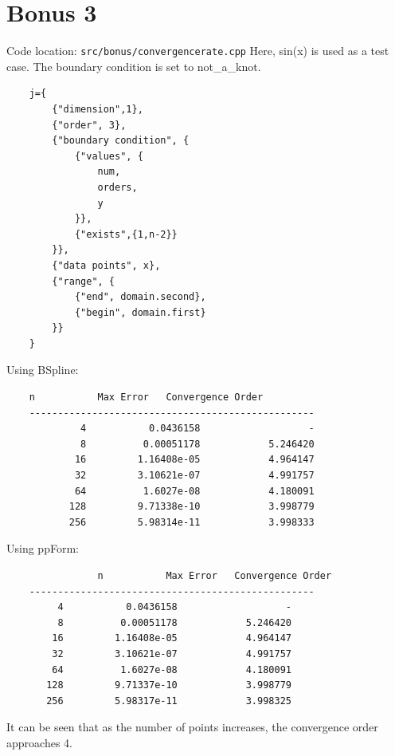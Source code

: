 \documentclass[a4paper]{article}
\begin{document}
\section*{Bonus 3}
Code location: \texttt{src/bonus/convergencerate.cpp}
Here, sin(x) is used as a test case.
The boundary condition is set to not\_a\_knot.
\begin{verbatim}
    j={
        {"dimension",1},
        {"order", 3},
        {"boundary condition", {
            {"values", {
                num,
                orders,
                y
            }},
            {"exists",{1,n-2}}
        }},
        {"data points", x},
        {"range", {
            {"end", domain.second},
            {"begin", domain.first}
        }}
    }
\end{verbatim}
Using BSpline:
\begin{verbatim}
    n           Max Error   Convergence Order
    --------------------------------------------------
             4           0.0436158                   -
             8          0.00051178            5.246420
            16         1.16408e-05            4.964147
            32         3.10621e-07            4.991757
            64          1.6027e-08            4.180091
           128         9.71338e-10            3.998779
           256         5.98314e-11            3.998333
\end{verbatim}
Using ppForm:
\begin{verbatim}
                n           Max Error   Convergence Order
    --------------------------------------------------
         4           0.0436158                   -
         8          0.00051178            5.246420
        16         1.16408e-05            4.964147
        32         3.10621e-07            4.991757
        64          1.6027e-08            4.180091
       128         9.71337e-10            3.998779
       256         5.98317e-11            3.998325
\end{verbatim}
It can be seen that as the number of points increases, the convergence order approaches 4.
\end{document}
